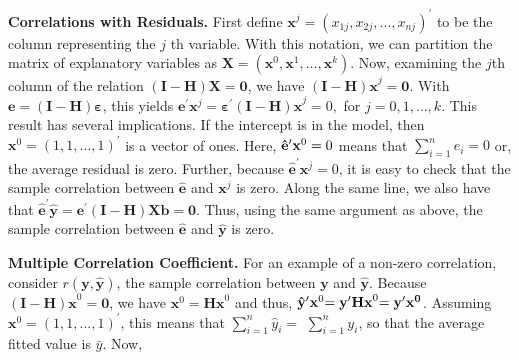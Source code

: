 \textbf{Correlations with Residuals.} First define $\mathbf{x}%
^{j}=(x_{1j},x_{2j},\dots,x_{nj})^{\prime }$ to be the column representing the $j$%
th variable. With this notation, we can partition the matrix of explanatory
variables as $\mathbf{X}=\left( \mathbf{x}^{0},\mathbf{x}^{1},\dots,\mathbf{x}^{k}%
\right)$. Now, examining the $j$th column of the relation $\mathbf{(I-H)X}=%
\mathbf{0}$, we have $\mathbf{(I-H)x}^{j}=\mathbf{0}$. With $%
\mathbf{e}=\mathbf{(I-H) \boldsymbol \varepsilon}$, this yields $
\mathbf{e}^{\prime }\mathbf{x}^{j}=\boldsymbol \varepsilon^{\prime }\mathbf{(I-H)x}%
^{j}=0,$ for $j=0,1,\ldots,k.$ This result has several implications.
If the intercept is in the model, then
$\mathbf{x}^{0}=(1,1,\ldots,1)^{\prime }$ is a vector of ones. Here, $\mathbf{\hat{%
e}}^{\prime }\mathbf{x}^{0}=0$ means that $\sum_{i=1}^{n}\hat{e}_{i}=0$ or,
the average residual is zero. Further, because $\mathbf{\hat{e}}^{\prime }%
\mathbf{x}^{j}=0$, it is easy to check that the sample correlation between $%
\mathbf{\hat{e}}$ and $\mathbf{x}^{j}$ is zero. Along the same line, we also
have that $\mathbf{\hat{e}}^{\prime }\mathbf{\hat{y}}=\mathbf{e}^{\prime }%
\mathbf{(I-H)Xb}=\mathbf{0}$. Thus, using the same argument as above, the
sample correlation between $\mathbf{\hat{e}}$ and $\mathbf{\hat{y}}$ is zero.


\textbf{Multiple Correlation Coefficient.} For an example of a non-zero
correlation, consider $r(\mathbf{y,\hat{y}})$, the sample correlation
between $\mathbf{y}$ and $\mathbf{\hat{y}}$. Because $\mathbf{(I-H)x}^{0}=%
\mathbf{0}$, we have $\mathbf{x}^{0}=\mathbf{Hx}^{0}$ and thus, $\mathbf{%
\hat{y}}^{\prime }\mathbf{x}^{0}\mathbf{=y}^{\prime }\mathbf{Hx}^{0}\mathbf{%
=y^{\prime} x^{0}}$. Assuming $\mathbf{x}^{0}=(1,1,\ldots,1)^{\prime
}$, this means that $\sum_{i=1}^{n}\hat{y}_{i}=$
$\sum_{i=1}^{n}y_{i}$, so that the average fitted value is
$\bar{y}$. Now,


